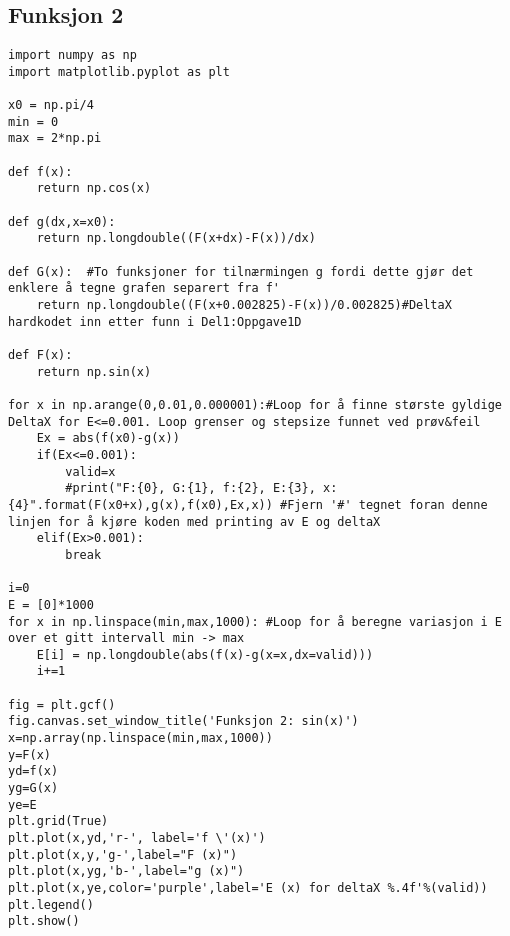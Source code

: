 \subsection{Funksjon 2}
\label{app:func2}
\begin{lstlisting}
import numpy as np
import matplotlib.pyplot as plt 

x0 = np.pi/4
min = 0
max = 2*np.pi

def f(x):
    return np.cos(x)

def g(dx,x=x0):
    return np.longdouble((F(x+dx)-F(x))/dx)

def G(x):  #To funksjoner for tilnærmingen g fordi dette gjør det enklere å tegne grafen separert fra f'
    return np.longdouble((F(x+0.002825)-F(x))/0.002825)#DeltaX hardkodet inn etter funn i Del1:Oppgave1D

def F(x):
    return np.sin(x)

for x in np.arange(0,0.01,0.000001):#Loop for å finne største gyldige DeltaX for E<=0.001. Loop grenser og stepsize funnet ved prøv&feil
    Ex = abs(f(x0)-g(x))
    if(Ex<=0.001):
        valid=x
        #print("F:{0}, G:{1}, f:{2}, E:{3}, x:{4}".format(F(x0+x),g(x),f(x0),Ex,x)) #Fjern '#' tegnet foran denne linjen for å kjøre koden med printing av E og deltaX
    elif(Ex>0.001):
        break

i=0
E = [0]*1000
for x in np.linspace(min,max,1000): #Loop for å beregne variasjon i E over et gitt intervall min -> max
    E[i] = np.longdouble(abs(f(x)-g(x=x,dx=valid)))
    i+=1

fig = plt.gcf()
fig.canvas.set_window_title('Funksjon 2: sin(x)')
x=np.array(np.linspace(min,max,1000))
y=F(x)
yd=f(x)
yg=G(x)
ye=E
plt.grid(True)
plt.plot(x,yd,'r-', label='f \'(x)')
plt.plot(x,y,'g-',label="F (x)")
plt.plot(x,yg,'b-',label="g (x)")
plt.plot(x,ye,color='purple',label='E (x) for deltaX %.4f'%(valid))
plt.legend()    
plt.show()
\end{lstlisting}
